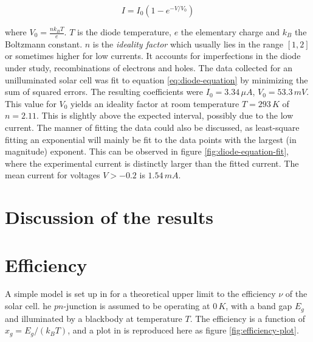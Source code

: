 \documentclass[a4paper,twoside=false,abstract=false,numbers=noenddot,
titlepage=false,headings=small,parskip=half,version=last]{scrartcl}
\begin{document}
\begin{equation}
    I = I_0 \left( 1 - e^{-V/V_0}\right)\label{eq:diode-equation}
\end{equation}

where $V_0 = \frac{nk_BT}{e}$.
$T$ is the diode temperature, $e$ the elementary charge and $k_B$ the Boltzmann constant.
$n$ is the \emph{ideality factor} which usually lies in the range $[1,2]$ or sometimes higher for low currents.
It accounts for imperfections in the diode under study, recombinations of electrons and holes.
The data collected for an unilluminated solar cell was fit to equation \eqref{eq:diode-equation} by minimizing the sum of squared errors.
The resulting coefficients were $I_0=3.34\,\mu A$, $V_0=53.3\, mV$.
This value for $V_0$ yields an ideality factor at room temperature $T=293\,K$ of $n = 2.11$.
This is slightly above the expected interval, possibly due to the low current.
The manner of fitting the data could also be discussed, as least-square fitting an exponential will mainly be fit to the data points with the largest (in magnitude) exponent.
This can be observed in figure \ref{fig:diode-equation-fit}, where the experimental current is distinctly larger than the fitted current.
The mean current for voltages $V>-0.2$ is $1.54\,mA$.
\section{Discussion of the results}


\section{Efficiency}
A simple model is set up in \cite{lab-instruction} for a theoretical upper limit to the efficiency $\nu$ of the solar cell.
he $pn$-junction is assumed to be operating at $0\,K$, with a band gap $E_g$ and illuminated by a blackbody at temperature $T$.
The efficiency is a function of $x_g=E_g/(k_BT)$, and a plot in \cite{lab-instruction} is reproduced here as figure \ref{fig:efficiency-plot}.
\end{document}
